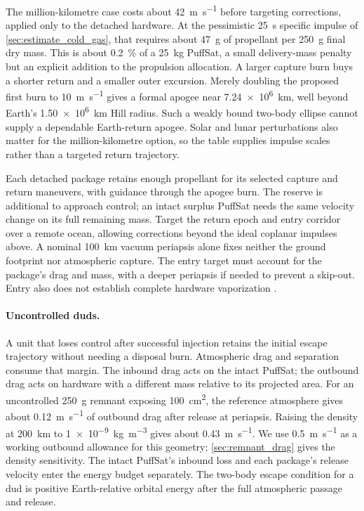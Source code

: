 \documentclass{article}
\begin{document}
The million-kilometre case costs about \SI{42}{\meter\per\second} before targeting corrections, applied only to the detached hardware. At the pessimistic \SI{25}{\second} specific impulse of \autoref{sec:estimate_cold_gas}, that requires about \SI{47}{\gram} of propellant per \SI{250}{\gram} final dry mass. This is about \SI{0.2}{\percent} of a \SI{25}{\kilo\gram} PuffSat, a small delivery-mass penalty but an explicit addition to the propulsion allocation. A larger capture burn buys a shorter return and a smaller outer excursion. Merely doubling the proposed first burn to \SI{10}{\meter\per\second} gives a formal apogee near \SI{7.24e6}{\kilo\meter}, well beyond Earth's \SI{1.50e6}{\kilo\meter} Hill radius. Such a weakly bound two-body ellipse cannot supply a dependable Earth-return apogee. Solar and lunar perturbations also matter for the million-kilometre option, so the table supplies impulse scales rather than a targeted return trajectory.

Each detached package retains enough propellant for its selected capture and return maneuvers, with guidance through the apogee burn. The reserve is additional to approach control; an intact surplus PuffSat needs the same velocity change on its full remaining mass. Target the return epoch and entry corridor over a remote ocean, allowing corrections beyond the ideal coplanar impulses above. A nominal \SI{100}{\kilo\meter} vacuum periapsis alone fixes neither the ground footprint nor atmospheric capture. The entry target must account for the package's drag and mass, with a deeper periapsis if needed to prevent a skip-out. Entry also does not establish complete hardware vaporization \cite{trisolini2019demise}.

\paragraph{Uncontrolled duds.}
A unit that loses control after successful injection retains the initial escape trajectory without needing a disposal burn. Atmospheric drag and separation consume that margin. The inbound drag acts on the intact PuffSat; the outbound drag acts on hardware with a different mass relative to its projected area. For an uncontrolled \SI{250}{\gram} remnant exposing \SI{100}{\square\centi\meter}, the reference atmosphere gives about \SI{0.12}{\meter\per\second} of outbound drag after release at periapsis. Raising the density at \SI{200}{\kilo\meter} to \SI{1e-9}{\kilogram\per\cubic\meter} gives about \SI{0.43}{\meter\per\second}. We use \SI{0.5}{\meter\per\second} as a working outbound allowance for this geometry; \autoref{sec:remnant_drag} gives the density sensitivity. The intact PuffSat's inbound loss and each package's release velocity enter the energy budget separately. The two-body escape condition for a dud is positive Earth-relative orbital energy after the full atmospheric passage and release.
\end{document}
